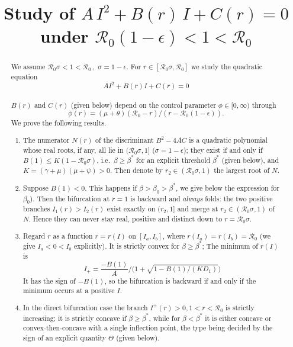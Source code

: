 \documentclass[11pt]{article}
\title{Study of %
$A\,I^2+B(r)\,I+C(r)=0$ under $\mathcal R_0(1-\epsilon)<1<\mathcal R_0$}
\date{}
\theoremstyle{remark}
\newcommand{\R}{\mathcal R_0}
\begin{document}
\maketitle

\begin{abstract}
\noindent We assume  $\R \sigma <1<\R\,,\,\, \sigma = 1-\epsilon$.    For $r \in [\R \sigma, \R]$  we study  the quadratic equation $$A I^2+B(r)I+C(r)=0$$ \\
 $B(r)$ and $C(r)$  (given below) depend on the control parameter $\phi \in[0,\infty) $
  through $$\phi(r)=(\mu+\theta)(\R-r)/(r-\R(1-\epsilon)) .$$ %
  \noindent    We prove the following results.
  
\begin{enumerate}

\item  The numerator $N(r)$ of the discriminant $B^2-4AC$ is a quadratic polynomial whose real roots, if any, all lie in $(\R\sigma,1]$ ($\sigma=1-\epsilon$); they exist if and only if $B(1)\le K(1-\R\sigma)$, i.e.\ $\beta\ge\beta^*$ for an explicit threshold $\beta^*$ (given below), and $K=(\gamma+\mu)(\mu+\psi)>0$.  Then denote   by  $r_2\in(\R\sigma,1)$ the largest root  of $N$. 

\item  Suppose $B(1)<0$.  This  happens if  $\beta>\beta_0>\beta^*$,  we give below  the expression for $\beta_0$).  Then  the bifurcation at $r=1$ is backward and \emph{always} folds: the two positive branches $I_1(r)>I_2(r)$ exist exactly on $(r_2,1]$ and merge at $r_2\in(\R\sigma,1)$ of $N$.  Hence  they can never stay real, positive and distinct down to $r=\R\sigma$. 

\item Regard $r$ as a function $r=r(I)$ on $[I_a,I_b]$, where $r(I_a)=r(I_b)=\R$  (we give  $I_a<0<I_b$  explicitly).  It  is strictly convex for $\beta\ge\beta^*$;  The minimum of $r(I)$ is  
$$I_+=\dfrac{-B(1)}{A}\Big/\Big(1+\sqrt{1-B(1)/(KD_1)}\Big)$$ 
It has  the sign of $-B(1)$, so the bifurcation is backward if and only if the minimum occurs at a positive $I$.

\item In the direct bifurcation case the  branch $I^+(r) > 0,  1 <  r <  \R $ is strictly increasing;   it is strictly concave if $\beta\ge\beta^*$, while for $\beta<\beta^*$ it is either concave or convex-then-concave with a single inflection point, the type being decided by the sign of an explicit quantity $\Theta$ (given below).
 \end{enumerate}
\end{abstract}
\end{document}
